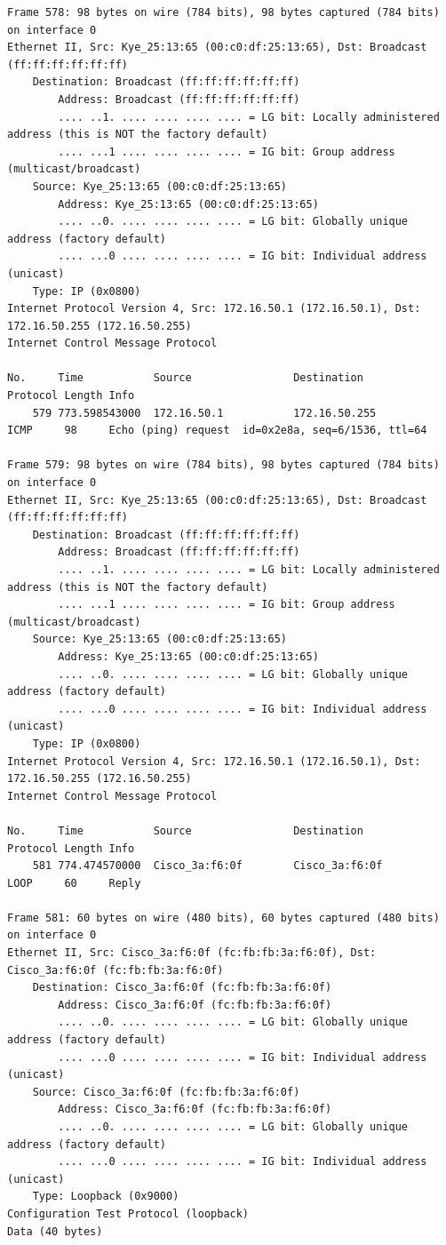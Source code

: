 \documentclass[a4paper,11pt]{article}
\begin{document}
\begin{lstlisting}
Frame 578: 98 bytes on wire (784 bits), 98 bytes captured (784 bits) on interface 0
Ethernet II, Src: Kye_25:13:65 (00:c0:df:25:13:65), Dst: Broadcast (ff:ff:ff:ff:ff:ff)
    Destination: Broadcast (ff:ff:ff:ff:ff:ff)
        Address: Broadcast (ff:ff:ff:ff:ff:ff)
        .... ..1. .... .... .... .... = LG bit: Locally administered address (this is NOT the factory default)
        .... ...1 .... .... .... .... = IG bit: Group address (multicast/broadcast)
    Source: Kye_25:13:65 (00:c0:df:25:13:65)
        Address: Kye_25:13:65 (00:c0:df:25:13:65)
        .... ..0. .... .... .... .... = LG bit: Globally unique address (factory default)
        .... ...0 .... .... .... .... = IG bit: Individual address (unicast)
    Type: IP (0x0800)
Internet Protocol Version 4, Src: 172.16.50.1 (172.16.50.1), Dst: 172.16.50.255 (172.16.50.255)
Internet Control Message Protocol

No.     Time           Source                Destination           Protocol Length Info
    579 773.598543000  172.16.50.1           172.16.50.255         ICMP     98     Echo (ping) request  id=0x2e8a, seq=6/1536, ttl=64

Frame 579: 98 bytes on wire (784 bits), 98 bytes captured (784 bits) on interface 0
Ethernet II, Src: Kye_25:13:65 (00:c0:df:25:13:65), Dst: Broadcast (ff:ff:ff:ff:ff:ff)
    Destination: Broadcast (ff:ff:ff:ff:ff:ff)
        Address: Broadcast (ff:ff:ff:ff:ff:ff)
        .... ..1. .... .... .... .... = LG bit: Locally administered address (this is NOT the factory default)
        .... ...1 .... .... .... .... = IG bit: Group address (multicast/broadcast)
    Source: Kye_25:13:65 (00:c0:df:25:13:65)
        Address: Kye_25:13:65 (00:c0:df:25:13:65)
        .... ..0. .... .... .... .... = LG bit: Globally unique address (factory default)
        .... ...0 .... .... .... .... = IG bit: Individual address (unicast)
    Type: IP (0x0800)
Internet Protocol Version 4, Src: 172.16.50.1 (172.16.50.1), Dst: 172.16.50.255 (172.16.50.255)
Internet Control Message Protocol

No.     Time           Source                Destination           Protocol Length Info
    581 774.474570000  Cisco_3a:f6:0f        Cisco_3a:f6:0f        LOOP     60     Reply

Frame 581: 60 bytes on wire (480 bits), 60 bytes captured (480 bits) on interface 0
Ethernet II, Src: Cisco_3a:f6:0f (fc:fb:fb:3a:f6:0f), Dst: Cisco_3a:f6:0f (fc:fb:fb:3a:f6:0f)
    Destination: Cisco_3a:f6:0f (fc:fb:fb:3a:f6:0f)
        Address: Cisco_3a:f6:0f (fc:fb:fb:3a:f6:0f)
        .... ..0. .... .... .... .... = LG bit: Globally unique address (factory default)
        .... ...0 .... .... .... .... = IG bit: Individual address (unicast)
    Source: Cisco_3a:f6:0f (fc:fb:fb:3a:f6:0f)
        Address: Cisco_3a:f6:0f (fc:fb:fb:3a:f6:0f)
        .... ..0. .... .... .... .... = LG bit: Globally unique address (factory default)
        .... ...0 .... .... .... .... = IG bit: Individual address (unicast)
    Type: Loopback (0x9000)
Configuration Test Protocol (loopback)
Data (40 bytes)


\end{lstlisting}
\end{document}
